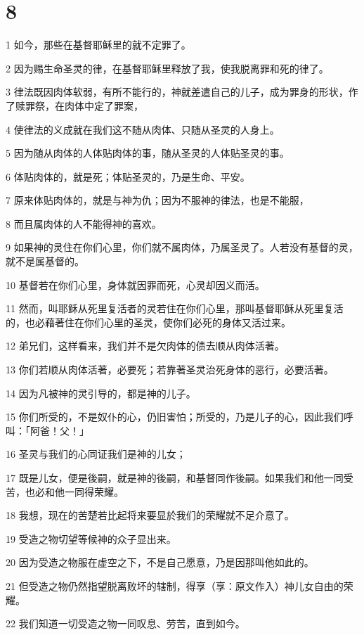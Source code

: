 \chapter{8}

\par 1 如今，那些在基督耶稣里的就不定罪了。
\par 2 因为赐生命圣灵的律，在基督耶稣里释放了我，使我脱离罪和死的律了。
\par 3 律法既因肉体软弱，有所不能行的，神就差遣自己的儿子，成为罪身的形状，作了赎罪祭，在肉体中定了罪案，
\par 4 使律法的义成就在我们这不随从肉体、只随从圣灵的人身上。
\par 5 因为随从肉体的人体贴肉体的事，随从圣灵的人体贴圣灵的事。
\par 6 体贴肉体的，就是死；体贴圣灵的，乃是生命、平安。
\par 7 原来体贴肉体的，就是与神为仇；因为不服神的律法，也是不能服，
\par 8 而且属肉体的人不能得神的喜欢。
\par 9 如果神的灵住在你们心里，你们就不属肉体，乃属圣灵了。人若没有基督的灵，就不是属基督的。
\par 10 基督若在你们心里，身体就因罪而死，心灵却因义而活。
\par 11 然而，叫耶稣从死里复活者的灵若住在你们心里，那叫基督耶稣从死里复活的，也必藉著住在你们心里的圣灵，使你们必死的身体又活过来。
\par 12 弟兄们，这样看来，我们并不是欠肉体的债去顺从肉体活著。
\par 13 你们若顺从肉体活著，必要死；若靠著圣灵治死身体的恶行，必要活著。
\par 14 因为凡被神的灵引导的，都是神的儿子。
\par 15 你们所受的，不是奴仆的心，仍旧害怕；所受的，乃是儿子的心，因此我们呼叫：「阿爸！父！」
\par 16 圣灵与我们的心同证我们是神的儿女；
\par 17 既是儿女，便是後嗣，就是神的後嗣，和基督同作後嗣。如果我们和他一同受苦，也必和他一同得荣耀。
\par 18 我想，现在的苦楚若比起将来要显於我们的荣耀就不足介意了。
\par 19 受造之物切望等候神的众子显出来。
\par 20 因为受造之物服在虚空之下，不是自己愿意，乃是因那叫他如此的。
\par 21 但受造之物仍然指望脱离败坏的辖制，得享（享：原文作入）神儿女自由的荣耀。
\par 22 我们知道一切受造之物一同叹息、劳苦，直到如今。
